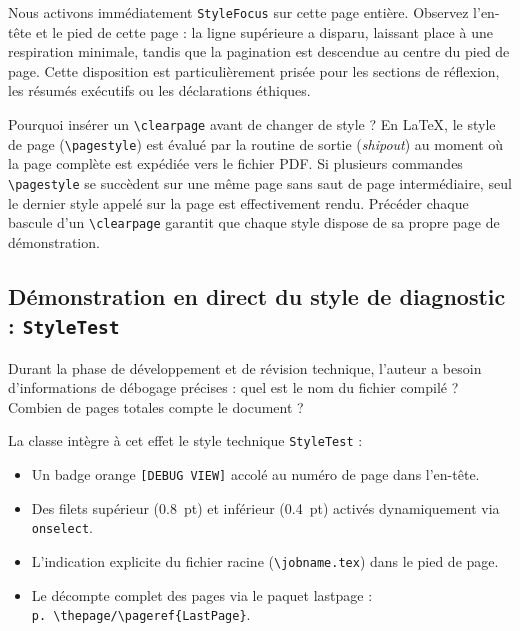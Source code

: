 Nous activons immédiatement \texttt{StyleFocus} sur cette page entière.
Observez l'en-tête et le pied de cette page :
la ligne supérieure a disparu, laissant place à une respiration minimale, tandis que la pagination est descendue au centre du pied de page.
Cette disposition est particulièrement prisée pour les sections de réflexion, les résumés exécutifs ou les déclarations éthiques.

\begin{boiteSynthese}{Pourquoi insérer un \texttt{\textbackslash clearpage} avant de changer de style ?}
  En \LaTeX{}, le style de page (\texttt{\textbackslash pagestyle}) est évalué par la routine de sortie (\emph{shipout}) au moment où la page complète est expédiée vers le fichier PDF.
  Si plusieurs commandes \texttt{\textbackslash pagestyle} se succèdent sur une même page sans saut de page intermédiaire, seul le dernier style appelé sur la page est effectivement rendu.
  Précéder chaque bascule d'un \texttt{\textbackslash clearpage} garantit que chaque style dispose de sa propre page de démonstration.
\end{boiteSynthese}

\clearpage
\pagestyle{StyleTest}

\subsection{Démonstration en direct du style de diagnostic : \texttt{StyleTest}}
\label{subsec:style_test}

Durant la phase de développement et de révision technique, l'auteur a besoin d'informations de débogage précises : quel est le nom du fichier compilé ? Combien de pages totales compte le document ?

La classe intègre à cet effet le style technique \texttt{StyleTest} :
\begin{itemize}
  \item Un badge orange \texttt{\tiny [DEBUG VIEW]} accolé au numéro de page dans l'en-tête.
  \item Des filets supérieur (\qty{0.8}{pt}) et inférieur (\qty{0.4}{pt}) activés dynamiquement via \texttt{onselect}.
  \item L'indication explicite du fichier racine (\texttt{\textbackslash jobname.tex}) dans le pied de page.
  \item Le décompte complet des pages via le paquet \textsf{lastpage} : \texttt{p.~\textbackslash thepage/\textbackslash pageref\{LastPage\}}.
\end{itemize}

